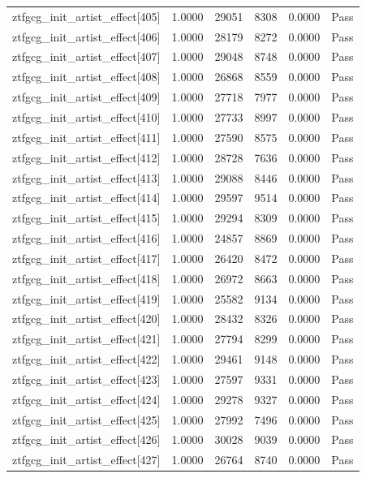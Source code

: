 \begin{table}[htbp]
\begin{tabular}{llrrll}
ztfgcg\_init\_artist\_effect[405] & 1.0000 & 29051 & 8308 & 0.0000 & Pass \\
ztfgcg\_init\_artist\_effect[406] & 1.0000 & 28179 & 8272 & 0.0000 & Pass \\
ztfgcg\_init\_artist\_effect[407] & 1.0000 & 29048 & 8748 & 0.0000 & Pass \\
ztfgcg\_init\_artist\_effect[408] & 1.0000 & 26868 & 8559 & 0.0000 & Pass \\
ztfgcg\_init\_artist\_effect[409] & 1.0000 & 27718 & 7977 & 0.0000 & Pass \\
ztfgcg\_init\_artist\_effect[410] & 1.0000 & 27733 & 8997 & 0.0000 & Pass \\
ztfgcg\_init\_artist\_effect[411] & 1.0000 & 27590 & 8575 & 0.0000 & Pass \\
ztfgcg\_init\_artist\_effect[412] & 1.0000 & 28728 & 7636 & 0.0000 & Pass \\
ztfgcg\_init\_artist\_effect[413] & 1.0000 & 29088 & 8446 & 0.0000 & Pass \\
ztfgcg\_init\_artist\_effect[414] & 1.0000 & 29597 & 9514 & 0.0000 & Pass \\
ztfgcg\_init\_artist\_effect[415] & 1.0000 & 29294 & 8309 & 0.0000 & Pass \\
ztfgcg\_init\_artist\_effect[416] & 1.0000 & 24857 & 8869 & 0.0000 & Pass \\
ztfgcg\_init\_artist\_effect[417] & 1.0000 & 26420 & 8472 & 0.0000 & Pass \\
ztfgcg\_init\_artist\_effect[418] & 1.0000 & 26972 & 8663 & 0.0000 & Pass \\
ztfgcg\_init\_artist\_effect[419] & 1.0000 & 25582 & 9134 & 0.0000 & Pass \\
ztfgcg\_init\_artist\_effect[420] & 1.0000 & 28432 & 8326 & 0.0000 & Pass \\
ztfgcg\_init\_artist\_effect[421] & 1.0000 & 27794 & 8299 & 0.0000 & Pass \\
ztfgcg\_init\_artist\_effect[422] & 1.0000 & 29461 & 9148 & 0.0000 & Pass \\
ztfgcg\_init\_artist\_effect[423] & 1.0000 & 27597 & 9331 & 0.0000 & Pass \\
ztfgcg\_init\_artist\_effect[424] & 1.0000 & 29278 & 9327 & 0.0000 & Pass \\
ztfgcg\_init\_artist\_effect[425] & 1.0000 & 27992 & 7496 & 0.0000 & Pass \\
ztfgcg\_init\_artist\_effect[426] & 1.0000 & 30028 & 9039 & 0.0000 & Pass \\
ztfgcg\_init\_artist\_effect[427] & 1.0000 & 26764 & 8740 & 0.0000 & Pass \\

\end{tabular}
\end{table}
